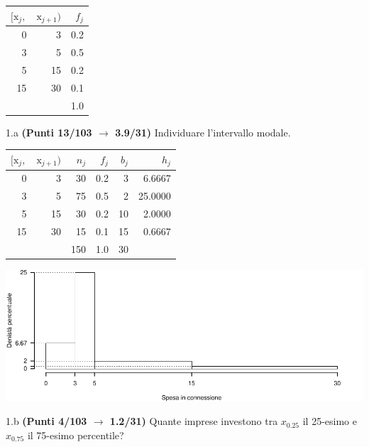 \documentclass[
  11pt,
]{book}
\theoremstyle{mytheoremstyle}
\theoremstyle{mydefstyle}
\newenvironment{sol}
  {
  \begin{tcolorbox}[enhanced,breakable,arc=0.1mm,boxrule=1pt,colback=white,colframe=iblue,
  title=\bf \fontfamily{lmss}\selectfont \hspace{.5 cm} Soluzione,drop fuzzy shadow]

}{
\end{tcolorbox}
  }
\begin{document}
\begin{table}[H]
\centering
\begin{tabular}{rrr}
\toprule
$[\text{x}_j,$ & $\text{x}_{j+1})$ & $f_j$\\
\midrule
0 & 3 & 0.2\\
3 & 5 & 0.5\\
5 & 15 & 0.2\\
15 & 30 & 0.1\\
 &  & 1.0\\
\bottomrule
\end{tabular}
\end{table}

1.a \textbf{(Punti 13/103 \(\rightarrow\) 3.9/31)} Individuare l'intervallo modale.

\begin{sol}

\begin{table}[H]
\centering
\begin{tabular}{rrrrrr}
\toprule
$[\text{x}_j,$ & $\text{x}_{j+1})$ & $n_j$ & $f_j$ & $b_j$ & $h_j$\\
\midrule
0 & 3 & 30 & 0.2 & 3 & 6.6667\\
3 & 5 & 75 & 0.5 & 2 & 25.0000\\
5 & 15 & 30 & 0.2 & 10 & 2.0000\\
15 & 30 & 15 & 0.1 & 15 & 0.6667\\
 &  & 150 & 1.0 & 30 & \\
\bottomrule
\end{tabular}
\end{table}

\begin{center}\includegraphics{Esami_passati_con_soluzioni_files/figure-latex/unnamed-chunk-36-1} \end{center}

\end{sol}

1.b \textbf{(Punti 4/103 \(\rightarrow\) 1.2/31)} Quante imprese investono tra \(x_{0.25}\) il 25-esimo e \(x_{0.75}\) il 75-esimo percentile?
\end{document}
